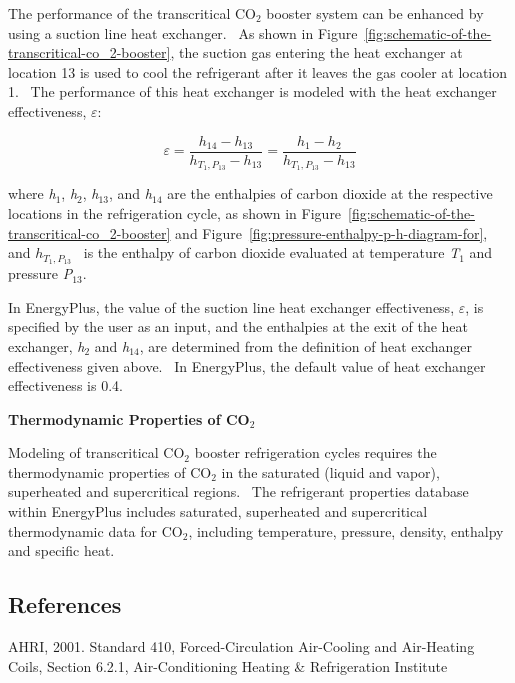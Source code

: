 The performance of the transcritical CO\(_{2}\) booster system can be enhanced by using a suction line heat exchanger.~ As shown in Figure~\ref{fig:schematic-of-the-transcritical-co_2-booster}, the suction gas entering the heat exchanger at location 13 is used to cool the refrigerant after it leaves the gas cooler at location 1.~ The performance of this heat exchanger is modeled with the heat exchanger effectiveness, \(\varepsilon\):

\begin{equation}
\varepsilon  = \frac{{{h_{14}} - {h_{13}}}}{{{h_{{T_1},{P_{13}}}} - {h_{13}}}} = \frac{{{h_1} - {h_2}}}{{{h_{{T_1},{P_{13}}}} - {h_{13}}}}
\end{equation}

where \emph{h}\(_{1}\), \emph{h}\(_{2}\), \emph{h}\(_{13}\), and \emph{h}\(_{14}\) are the enthalpies of carbon dioxide at the respective locations in the refrigeration cycle, as shown in Figure~\ref{fig:schematic-of-the-transcritical-co_2-booster} and Figure~\ref{fig:pressure-enthalpy-p-h-diagram-for}, and \({h_{{T_1},{P_{13}}}}\) ~is the enthalpy of carbon dioxide evaluated at temperature \emph{T}\(_{1}\) and pressure \emph{P}\(_{13}\).

In EnergyPlus, the value of the suction line heat exchanger effectiveness, \(\varepsilon\), is specified by the user as an input, and the enthalpies at the exit of the heat exchanger, \emph{h}\(_{2}\) and \emph{h}\(_{14}\), are determined from the definition of heat exchanger effectiveness given above.~ In EnergyPlus, the default value of heat exchanger effectiveness is 0.4.

\textbf{Thermodynamic Properties of CO\(_{2}\)}

Modeling of transcritical CO\(_{2}\) booster refrigeration cycles requires the thermodynamic properties of CO\(_{2}\) in the saturated (liquid and vapor), superheated and supercritical regions.~ The refrigerant properties database within EnergyPlus includes saturated, superheated and supercritical thermodynamic data for CO\(_{2}\), including temperature, pressure, density, enthalpy and specific heat.

\subsection{References}\label{references-040}

AHRI, 2001. Standard 410, Forced-Circulation Air-Cooling and Air-Heating Coils, Section 6.2.1, Air-Conditioning Heating \& Refrigeration Institute

